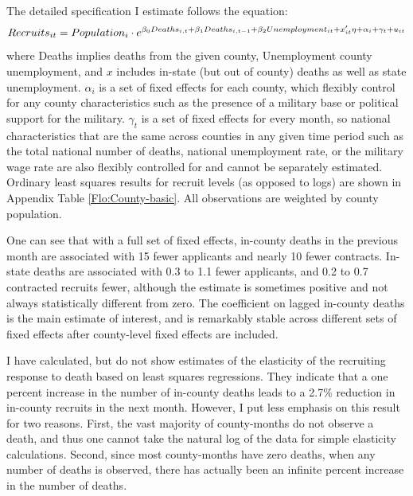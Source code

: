 \documentclass[12pt] {article}
\begin{document}
The detailed specification I estimate follows the equation: 
$$Recruits_{it}=Population_{i}\cdot e^{\beta_{0}Deaths_{i,t}+\beta_{1}Deaths_{i,t-1}+\beta_{2}Unemployment_{it}\\
+x'_{it}\eta+\alpha_{i}+\gamma_{t}+u_{it}}$$
where Deaths implies deaths from the given county, Unemployment county unemployment, and $x$ includes in-state (but out of county) deaths as well as
state unemployment. $\alpha_{i}$ is a set of fixed effects for each county, which flexibly control for any county characteristics such as the presence of a military base or political support for the military. $\gamma_{t}$ is a set of fixed effects for every month,
so national characteristics that are the same across counties in any
given time period such as the total national number of deaths, national
unemployment rate, or the military wage rate are also flexibly controlled for and cannot be separately estimated. 
Ordinary least squares results
 for recruit levels (as opposed to logs) are shown in Appendix Table \ref{Flo:County-basic}. All observations are weighted by county population. 
 

One can see that with a full set of fixed effects, in-county deaths in the previous month are associated with 15 fewer applicants and nearly 10 fewer contracts. In-state deaths
are associated with 0.3 to 1.1 fewer applicants, and 0.2 to 0.7 contracted
recruits fewer, although the estimate is sometimes positive and not
always statistically different from zero. The coefficient on lagged
in-county deaths is the main estimate of interest, and is remarkably
stable across different sets of fixed effects after county-level fixed
effects are included.

I have calculated, but do not show estimates of the elasticity of
the recruiting response to death based on least squares regressions.
They indicate that a one percent increase in the number of in-county
deaths leads to a 2.7\% reduction in in-county recruits in the next
month. However, I put less emphasis on this result for two reasons.
First, the vast majority of county-months do not observe a death,
and thus one cannot take the natural log of the data for simple elasticity
calculations. Second, since most county-months have zero deaths, when
any number of deaths is observed, there has actually been an infinite
percent increase in the number of deaths. 
\end{document}
